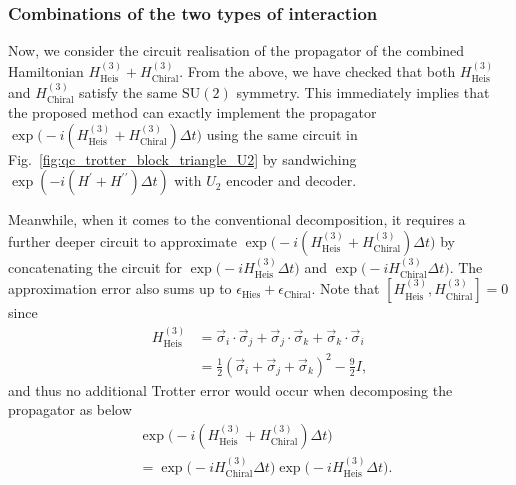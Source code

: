 \documentclass[aps,showpacs,amsmath,amssymb,twocolumn,prx,longbibliography,superscriptaddress,notitlepage,floatfix,10pt]{revtex4-2}
\begin{document}
\subsubsection{Combinations of the two types of interaction}

Now, we consider the circuit realisation of the propagator of the combined Hamiltonian $H_{\mathrm{Heis}}^{(3)}+H_{\mathrm{Chiral}}^{(3)}$.
From the above, we have checked that both $H_{\mathrm{Heis}}^{(3)}$ and $H_{\mathrm{Chiral}}^{(3)}$ satisfy the same $\mathrm{SU}(2)$ symmetry.
This immediately implies that the proposed method can exactly implement the propagator $\exp\bigl(-i(H_{\mathrm{Heis}}^{(3)}+H_{\mathrm{Chiral}}^{(3)}) \Delta t\bigr)$ using the same circuit in Fig.~\ref{fig:qc_trotter_block_triangle_U2} by sandwiching $\exp\left(-i(H^{\prime}+H^{\prime\prime})\Delta t\right)$ with $U_{2}$ encoder and decoder.

Meanwhile, when it comes to the conventional decomposition, it requires a further deeper circuit to approximate $\exp\bigl(-i(H_{\mathrm{Heis}}^{(3)}+H_{\mathrm{Chiral}}^{(3)}) \Delta t\bigr)$ by concatenating the circuit for $\exp\bigl(-iH_{\mathrm{Heis}}^{(3)}\Delta t\bigr)$ and $\exp\bigl(-iH_{\mathrm{Chiral}}^{(3)} \Delta t\bigr)$.
The approximation error also sums up to $\epsilon_{\mathrm{Hies}} + \epsilon_{\mathrm{Chiral}}$.
Note that $[H_{\mathrm{Heis}}^{(3)},H_{\mathrm{Chiral}}^{(3)}]=0$ since 
\begin{equation}
\begin{split}
    H_{\mathrm{Heis}}^{(3)}
    &= \vec{\sigma}_{i}\cdot\vec{\sigma}_{j}+\vec{\sigma}_{j}\cdot\vec{\sigma}_{k}+\vec{\sigma}_{k}\cdot\vec{\sigma}_{i} \\
    &= \frac{1}{2}(\vec{\sigma}_{i}+\vec{\sigma}_{j}+\vec{\sigma}_{k})^{2}- \frac{9}{2}I,
\end{split}
\end{equation}
and thus no additional Trotter error would occur when decomposing the propagator as below
\begin{equation}\label{eq:split_H2H3}
\begin{split}
    & \exp\bigl(-i(H_{\mathrm{Heis}}^{(3)}+H_{\mathrm{Chiral}}^{(3)}) \Delta t\bigr) \\
    &= \exp\bigl(-iH_{\mathrm{Chiral}}^{(3)} \Delta t\bigr)
    \exp\bigl(-iH_{\mathrm{Heis}}^{(3)} \Delta t\bigr).
\end{split}
\end{equation}
\end{document}
